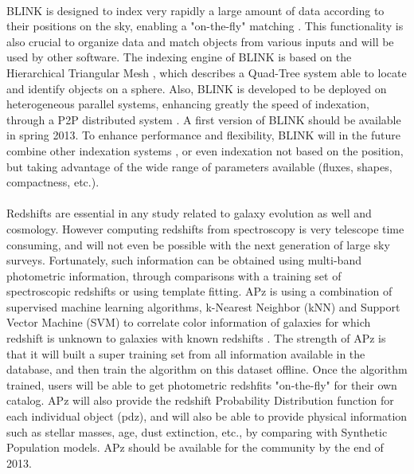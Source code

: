 \\
BLINK is designed to index very rapidly a large amount of data according to their positions on the sky, enabling a "on-the-fly" matching \citep{blink}. This functionality is also crucial to organize data and match objects from various inputs and will be used by other software.
The indexing engine of BLINK is based on the Hierarchical Triangular Mesh \citep[HTM -][]{htm}, which describes a Quad-Tree system able to locate and identify objects on a sphere. Also, BLINK is developed to be deployed on heterogeneous parallel systems, enhancing greatly the speed of indexation, through a P2P distributed system \citep[c.f.][]{tang10}. A first version of BLINK should be available in spring 2013.
To enhance performance and flexibility, BLINK will in the future combine other indexation systems \citep[HEALPix -][]{healpix}, or even indexation not based on the position, but taking advantage of the wide range of parameters available (fluxes, shapes, compactness, etc.).\\

\\
Redshifts are essential in any study related to galaxy evolution as well and cosmology. However computing redshifts from spectroscopy is very telescope time consuming, and will not even be possible with the next generation of large sky surveys. Fortunately, such information can be obtained using multi-band photometric information, through comparisons with a training set of spectroscopic redshifts or using template fitting.
APz is using a combination of supervised machine learning algorithms, k-Nearest Neighbor (kNN) and Support Vector Machine (SVM) to correlate color information of galaxies for which redshift is unknown to galaxies with known redshifts \citep[refer to e.g.,][]{bb10}. The strength of APz is that it will built a super training set from all information available in the database, and then train the algorithm on this dataset offline. Once the algorithm trained, users will be able to get photometric redshfits "on-the-fly" for their own catalog. APz will also provide the redshift Probability Distribution function for each individual object (pdz), and will also be able to provide physical information such as stellar masses, age, dust extinction, etc., by comparing with Synthetic Population models. APz should be available for the community by the end of 2013.\\

